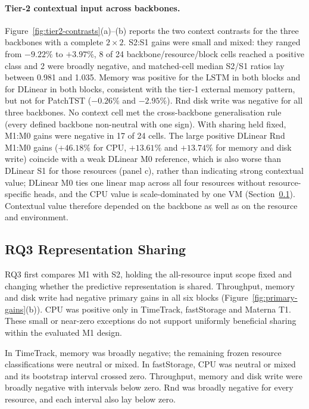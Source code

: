 \documentclass[5p,twocolumn]{elsarticle}
\begin{document}
\paragraph{Tier-2 contextual input across backbones.}
Figure~\ref{fig:tier2-contrasts}(a)--(b) reports the two context contrasts
for the three backbones with a complete $2\times2$. S2:S1 gains were small
and mixed: they ranged from $-9.22\%$ to $+3.97\%$, 8 of 24
backbone/resource/block cells reached a positive class and 2 were broadly
negative, and matched-cell median S2/S1 ratios lay between 0.981 and 1.035.
Memory was positive for the LSTM in both blocks and for DLinear in both
blocks, consistent with the tier-1 external memory pattern, but not for
PatchTST ($-0.26\%$ and $-2.95\%$). Rnd disk write was negative for all
three backbones. No context cell met the cross-backbone generalisation rule
(every defined backbone non-neutral with one sign). With sharing held fixed,
M1:M0 gains were negative in 17 of 24 cells. The large positive DLinear Rnd
M1:M0 gains ($+46.18\%$ for CPU, $+13.61\%$ and $+13.74\%$ for memory and disk
write) coincide with a weak DLinear M0 reference, which is also worse than
DLinear S1 for those resources (panel c), rather than indicating strong
contextual value; DLinear M0 ties one linear map across all four resources without
resource-specific heads, and the CPU value is scale-dominated by one VM
(Section~\ref{sec:results-rq2}). Contextual value therefore depended on the
backbone as well as on the resource and environment.

\subsection{RQ3 Representation Sharing}
\label{sec:results-rq2}

RQ3 first compares M1 with S2, holding the all-resource input scope fixed and changing
whether the predictive representation is shared. Throughput, memory and disk
write had negative primary gains in all six blocks
(Figure~\ref{fig:primary-gains}(b)). CPU was positive only in TimeTrack,
fastStorage and Materna T1. These small or near-zero exceptions do not support
uniformly beneficial sharing within the evaluated M1 design.

In TimeTrack, memory was broadly negative; the remaining frozen resource
classifications were neutral or mixed. In fastStorage, CPU was neutral or
mixed and its bootstrap interval crossed zero. Throughput, memory and disk
write were broadly negative with intervals below zero. Rnd was broadly
negative for every resource, and each interval also lay below zero.
\end{document}
